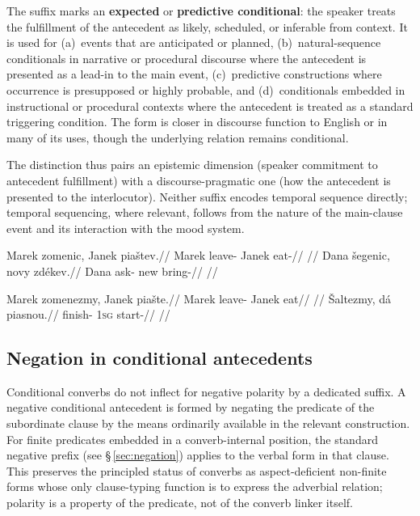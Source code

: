 The suffix  marks an \textbf{expected} or \textbf{predictive
conditional}: the speaker treats the fulfillment of the antecedent as
likely, scheduled, or inferable from context. It is used for (a)~events
that are anticipated or planned, (b)~natural-sequence conditionals in
narrative or procedural discourse where the antecedent is presented as
a lead-in to the main event, (c)~predictive  constructions
where occurrence is presupposed or highly probable, and (d)~conditionals
embedded in instructional or procedural contexts where the antecedent is
treated as a standard triggering condition. The form is closer in
discourse function to English  or  in many of its
uses, though the underlying relation remains conditional.

The distinction thus pairs an epistemic dimension (speaker commitment to
antecedent fulfillment) with a discourse-pragmatic one (how the
antecedent is presented to the interlocutor). Neither suffix encodes
temporal sequence directly; temporal sequencing, where relevant, follows
from the nature of the main-clause event and its interaction with the
mood system.

\pex \label{ex:cond-open}
\a
\begingl
\gla Marek zomenic, Janek piaštev.//
\glb Marek leave-\Cond{} Janek eat-\Irr{}//
\glft {} //
\endgl
\a
\begingl
\gla Dana šegenic, novy zdékev.//
\glb Dana ask-\Cond{} new bring-\Irr{}//
\glft {} //
\endgl
\xe

\pex \label{ex:cond-expected}
\a
\begingl
\gla Marek zomenezmy, Janek piašte.//
\glb Marek leave-\ECond{} Janek eat//
\glft {} //
\endgl
\a
\begingl
\gla Šaltezmy, dá piasnou.//
\glb finish-\ECond{} \textsc{1sg} start-\Seq{}//
\glft {} //
\endgl
\xe

\subsection{Negation in conditional antecedents}\label{sec:cond-negation}

Conditional converbs do not inflect for negative polarity by a dedicated
suffix. A negative conditional antecedent is formed by negating the
predicate of the subordinate clause by the means ordinarily available in
the relevant construction. For finite predicates embedded in a
converb-internal position, the standard negative prefix  (see
§\,\ref{sec:negation}) applies to the verbal form in that clause. This
preserves the principled status of converbs as aspect-deficient non-finite
forms whose only clause-typing function is to express the adverbial
relation; polarity is a property of the predicate, not of the converb
linker itself.

